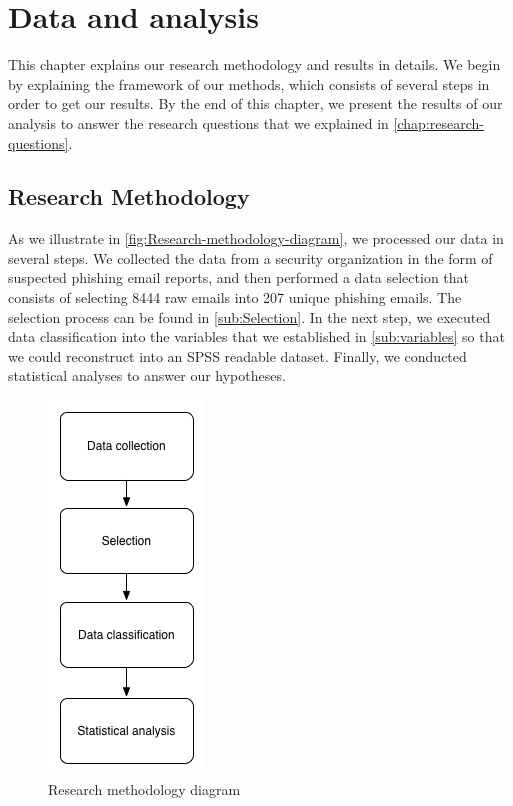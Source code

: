 %

\chapter{\label{chap:Data-and-analysis}Data and analysis}

This chapter explains our research methodology and results in details.
We begin by explaining the framework of our methods, which consists
of several steps in order to get our results. By the end of this chapter,
we present the results of our analysis to answer the research questions
that we explained in \autoref{chap:research-questions}.


\section{\label{sec:Research-Methodology}Research Methodology}

As we illustrate in \autoref{fig:Research-methodology-diagram}, we
processed our data in several steps. We collected the data from a
security organization in the form of suspected phishing email reports,
and then performed a data selection that consists of selecting 8444
raw emails into 207 unique phishing emails. The selection process
can be found in \autoref{sub:Selection}. In the next step, we executed
data classification into the variables that we established in \autoref{sub:variables}
so that we could reconstruct into an SPSS readable dataset. Finally,
we conducted statistical analyses to answer our hypotheses.

\begin{figure}[H]
\begin{centering}
\includegraphics[scale=0.7]{gfx/methodology_diagram}\protect\caption{\label{fig:Research-methodology-diagram}Research methodology diagram}

\par\end{centering}

%
%
\end{figure}




